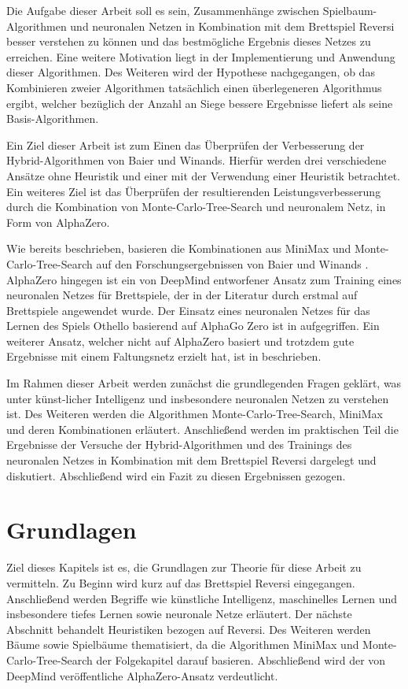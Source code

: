 \documentclass[12pt,a4paper,bibliography=totocnumbered,listof=totocnumbered]{article}
\begin{document}
Die Aufgabe dieser Arbeit soll es sein, Zusammenhänge zwischen Spielbaum-Algorithmen und neuronalen Netzen in Kombination mit dem Brettspiel Reversi besser verstehen zu können und das bestmögliche Ergebnis dieses Netzes zu erreichen. Eine weitere Motivation liegt in der Implementierung und Anwendung dieser Algorithmen. Des Weiteren wird der Hypothese nachgegangen, ob das Kombinieren zweier Algorithmen tatsächlich einen überlegeneren Algorithmus ergibt, welcher bezüglich der Anzahl an Siege bessere Ergebnisse liefert als seine Basis-Algorithmen.

Ein Ziel dieser Arbeit ist zum Einen das Überprüfen der Verbesserung der Hybrid-Algorithmen von Baier und Winands. Hierfür werden drei verschiedene Ansätze ohne Heuristik und einer mit der Verwendung einer Heuristik betrachtet. Ein weiteres Ziel ist das Überprüfen der resultierenden Leistungsverbesserung durch die Kombination von Monte-Carlo-Tree-Search und neuronalem Netz, in Form von AlphaZero.

Wie bereits beschrieben, basieren die Kombinationen aus MiniMax und Monte-Carlo-Tree-Search auf den Forschungsergebnissen von Baier und Winands \cite{Baier.2015} \cite{Baier.2018}. AlphaZero hingegen ist ein von DeepMind entworfener Ansatz zum Training eines neuronalen Netzes für Brettspiele, der in der Literatur durch \cite{Silver.05.12.2017} erstmal auf Brettspiele angewendet wurde. Der Einsatz eines neuronalen Netzes für das Lernen des Spiels Othello basierend auf AlphaGo Zero ist in \cite{Shantanu.2018} aufgegriffen. Ein weiterer Ansatz, welcher nicht auf AlphaZero basiert und trotzdem gute Ergebnisse mit einem Faltungsnetz erzielt hat, ist in \cite{Liskowski.2018} beschrieben.

Im Rahmen dieser Arbeit werden zunächst die grundlegenden Fragen geklärt, was unter künst-licher Intelligenz und insbesondere neuronalen Netzen zu verstehen ist. Des Weiteren werden die Algorithmen Monte-Carlo-Tree-Search, MiniMax und deren Kombinationen erläutert. Anschließend werden im praktischen Teil die Ergebnisse der Versuche der Hybrid-Algorithmen und des Trainings des neuronalen Netzes in Kombination mit dem Brettspiel Reversi dargelegt und diskutiert. Abschließend wird ein Fazit zu diesen Ergebnissen gezogen.


\pagebreak
\section{Grundlagen}
Ziel dieses Kapitels ist es, die Grundlagen zur Theorie für diese Arbeit zu vermitteln. Zu Beginn wird kurz auf das Brettspiel Reversi eingegangen. Anschließend werden Begriffe wie künstliche Intelligenz, maschinelles Lernen und insbesondere tiefes Lernen sowie neuronale Netze erläutert. Der nächste Abschnitt behandelt Heuristiken bezogen auf Reversi. Des Weiteren werden Bäume sowie Spielbäume thematisiert, da die Algorithmen MiniMax und Monte-Carlo-Tree-Search der Folgekapitel darauf basieren. Abschließend wird der von DeepMind veröffentliche AlphaZero-Ansatz verdeutlicht.
\end{document}
